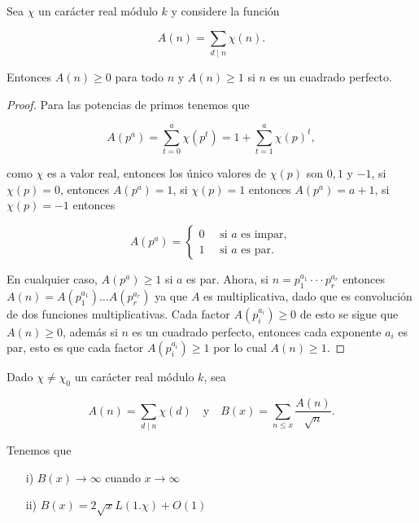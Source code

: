 \begin{theorem}
Sea $\chi$ un carácter real módulo $k$ y considere la función

$$A(n)=\sum_{d\mid n} \chi(n).$$

Entonces $A(n)\geq 0$ para todo $n$ y $A(n)\geq 1$ si $n$ es un cuadrado perfecto.
\end{theorem}

\begin{proof}
Para las potencias de primos tenemos que

$$A(p^a)=\sum_{t=0}^{a}\chi(p^t)=1+\sum_{t=1}^{a} \chi(p)^t,$$

como $\chi$ es a valor real, entonces los único valores de $\chi(p)$  son $0,1$ y $-1$, si $\chi(p)=0$, entonces $A(p^a)=1$, si $\chi(p)=1$ entonces $A(p^a)=a+1$, si $\chi(p)=-1$ entonces

$$A(p^a)=\begin{cases}
0 \quad\text{ si } a \text{ es impar},\\
1 \quad\text{ si } a \text{ es par}.
\end{cases}$$

En cualquier caso, $A(p^a)\geq 1$ si $a$ es par. Ahora, si $n=p_1^{a_1}\cdot\cdot\cdot p_r^{a_r}$ entonces $A(n)=A(p_1^{a_1})\ldots A(p_r^{a_r})$ ya que $A$ es multiplicativa, dado que es convolución de dos funciones multiplicativas. Cada factor $A(p_i^{a_i})\geq 0$ de esto se sigue que $A(n)\geq 0$, además si $n$ es un cuadrado perfecto, entonces cada exponente $a_i$ es par, esto es que cada factor $A(p_i^{a_i})\geq 1$ por lo cual $A(n)\geq 1$.
\end{proof}


\begin{theorem}
Dado $\chi\neq\chi_0$ un carácter real módulo $k$, sea

$$A(n)=\sum_{d\mid n}\chi(d)\quad \text{y} \quad B(x)=\sum_{n\leq x}\frac{A(n)}{\sqrt{n}}.$$

Tenemos que

\begin{itemize}
\item[i)] $B(x)\to\infty$ cuando $x\to\infty$

\item[ii)] $B(x)=2 \sqrt{x} L(1.\chi)+O(1)$
\end{itemize}
\end{theorem}


